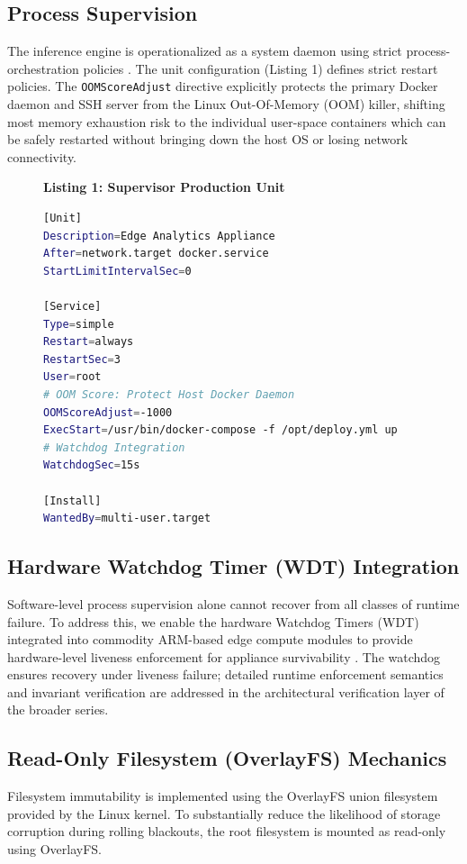 \documentclass[conference]{IEEEtran}
\begin{document}
\subsection{Process Supervision}
The inference engine is operationalized as a system daemon using strict process-orchestration policies \cite{b16}. The unit configuration (Listing 1) defines strict restart policies. The \texttt{OOMScoreAdjust} directive explicitly protects the primary Docker daemon and SSH server from the Linux Out-Of-Memory (OOM) killer, shifting most memory exhaustion risk to the individual user-space containers which can be safely restarted without bringing down the host OS or losing network connectivity.

\begin{figure}[htbp]
\textbf{Listing 1: Supervisor Production Unit}
\begin{lstlisting}[language=bash]
[Unit]
Description=Edge Analytics Appliance
After=network.target docker.service
StartLimitIntervalSec=0

[Service]
Type=simple
Restart=always
RestartSec=3
User=root
# OOM Score: Protect Host Docker Daemon
OOMScoreAdjust=-1000
ExecStart=/usr/bin/docker-compose -f /opt/deploy.yml up
# Watchdog Integration
WatchdogSec=15s

[Install]
WantedBy=multi-user.target
\end{lstlisting}
\label{fig:systemd}
\end{figure}

\subsection{Hardware Watchdog Timer (WDT) Integration}

Software-level process supervision alone cannot recover from all classes of runtime failure. To address this, we enable the hardware Watchdog Timers (WDT) integrated into commodity ARM-based edge compute modules to provide hardware-level liveness enforcement for appliance survivability \cite{b15}. The watchdog ensures recovery under liveness failure; detailed runtime enforcement semantics and invariant verification are addressed in the architectural verification layer of the broader series.

\subsection{Read-Only Filesystem (OverlayFS) Mechanics}

Filesystem immutability is implemented using the OverlayFS union filesystem provided by the Linux kernel. To substantially reduce the likelihood of storage corruption during rolling blackouts, the root filesystem is mounted as read-only using OverlayFS. 
\end{document}

